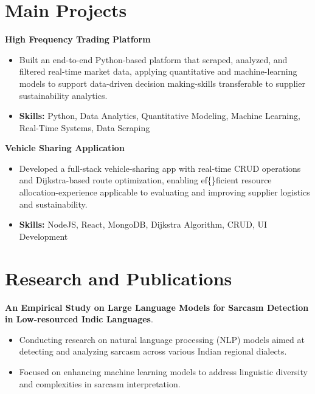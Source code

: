 \documentclass[a4paper,11pt]{article}
\begin{document}
\section{\textbf{Main Projects}}

\vspace{1mm}
  \textbf{High Frequency Trading Platform  }
\vspace{-1.5mm} %
\begin{itemize}
  \item Built an end-to-end Python-based platform that scraped, analyzed, and filtered real-time market data, applying quantitative and machine-learning models to support data-driven decision making-skills transferable to supplier sustainability analytics.
\vspace{-3mm}
  \item \textbf{Skills:} Python, Data Analytics, Quantitative Modeling, Machine Learning, Real-Time Systems, Data Scraping
\end{itemize}


\vspace{1mm}
   \textbf{Vehicle Sharing Application }
\vspace{-1.5mm} %
\begin{itemize}
  \item Developed a full-stack vehicle-sharing app with real-time CRUD operations and Dijkstra-based route optimization, enabling ef\{\}ficient resource allocation-experience applicable to evaluating and improving supplier logistics and sustainability.
\vspace{-3mm}
  \item \textbf{Skills:} NodeJS, React, MongoDB, Dijkstra Algorithm, CRUD, UI Development
\end{itemize}



\section{\textbf{Research and Publications} \hfill }
\vspace{1mm}
  \textbf{An Empirical Study on Large Language Models for Sarcasm Detection in Low-resourced Indic Languages}.
\vspace{-1mm} %
\begin{itemize}
  \item Conducting research on natural language processing (NLP) models aimed at detecting and analyzing sarcasm across various Indian regional dialects.
\vspace{-3mm}
  \item Focused on enhancing machine learning models to address linguistic diversity and complexities in sarcasm interpretation.
\end{itemize}
\end{document}
